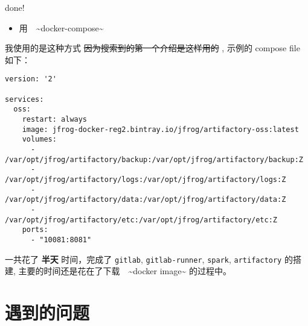 \documentclass[11pt,a4paper]{article}
\begin{document}
done!

\begin{itemize}
\item 用　\textasciitilde{}docker-compose\textasciitilde{}
\end{itemize}

我使用的是这种方式 \sout{因为搜索到的第一个介绍是这样用的} , 示例的 compose file 如下：

\begin{lstlisting}
version: '2'

services:
  oss:
    restart: always
    image: jfrog-docker-reg2.bintray.io/jfrog/artifactory-oss:latest
    volumes:
      - /var/opt/jfrog/artifactory/backup:/var/opt/jfrog/artifactory/backup:Z
      - /var/opt/jfrog/artifactory/logs:/var/opt/jfrog/artifactory/logs:Z
      - /var/opt/jfrog/artifactory/data:/var/opt/jfrog/artifactory/data:Z
      - /var/opt/jfrog/artifactory/etc:/var/opt/jfrog/artifactory/etc:Z
    ports:
      - "10081:8081"
\end{lstlisting}

一共花了 \textbf{半天} 时间，完成了 \verb~gitlab~, \verb~gitlab-runner~, \verb~spark~, \verb~artifactory~ 的搭建, 主要的时间还是花在了下载　\textasciitilde{}docker image\textasciitilde{} 的过程中。


\section*{遇到的问题}
\label{sec-3}
\end{document}
